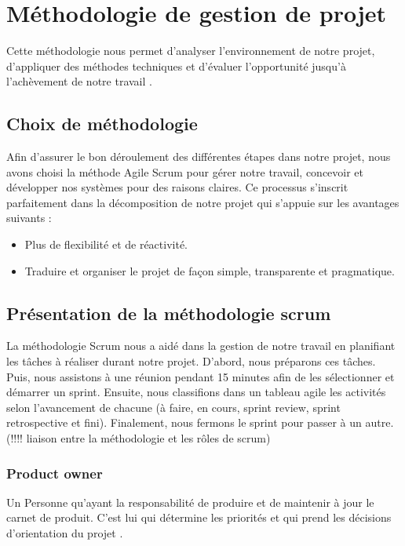	
	
	\section[Methodologie]{Méthodologie de gestion de projet }
	Cette méthodologie nous permet d'analyser l'environnement de notre projet, d'appliquer des méthodes techniques et d'évaluer l'opportunité jusqu'à l'achèvement de notre travail .
	\subsection{Choix de méthodologie }
	Afin d'assurer le bon déroulement des différentes étapes dans notre projet, nous avons choisi la méthode Agile Scrum pour gérer notre travail, concevoir et développer nos systèmes pour des raisons claires. Ce processus  s'inscrit parfaitement dans la décomposition de notre projet qui s'appuie sur les avantages suivants :
	\begin{itemize}
		\item Plus de flexibilité et de réactivité.
		\item Traduire et organiser le projet de façon simple, transparente et pragmatique.
	\end{itemize}
	
\subsection{Présentation de la méthodologie scrum }
La méthodologie Scrum nous a aidé dans la gestion de notre travail en planifiant les tâches à réaliser durant notre projet. D'abord, nous préparons ces tâches. Puis, nous assistons à une réunion pendant 15 minutes afin de les sélectionner et démarrer un sprint. Ensuite, nous classifions dans un tableau agile les activités selon l'avancement de chacune (à faire, en cours, sprint review, sprint retrospective et fini). Finalement, nous fermons le sprint pour passer à un autre.(!!!! liaison entre la méthodologie et les rôles de scrum)

\subsubsection{Product owner }
	Un Personne qu'ayant la responsabilité de produire et de maintenir à jour le carnet de produit. C'est lui qui détermine les priorités et qui prend les décisions d'orientation du projet .
